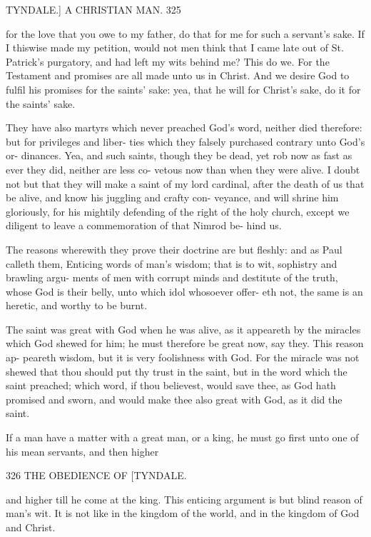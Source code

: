 \documentclass{custom}
\begin{document}
{TYNDALE.] A CHRISTIAN MAN. 325

for the love that you owe to my father, do that for me for
such a servant's sake. If I thiswise made my petition,
would not men think that I came late out of St. Patrick's
purgatory, and had left my wits behind me? This do we.
For the Testament and promises are all made unto us in
Christ. And we desire God to fulfil his promises for
the saints' sake: yea, that he will for Christ's sake, do it
for the saints' sake.

They have also martyrs which never preached God's
word, neither died therefore: but for privileges and liber-
ties which they falsely purchased contrary unto God's or-
dinances. Yea, and such saints, though they be dead,
yet rob now as fast as ever they did, neither are less co-
vetous now than when they were alive. I doubt not but that
they will make a saint of my lord cardinal, after the death
of us that be alive, and know his juggling and crafty con-
veyance, and will shrine him gloriously, for his mightily
defending of the right of the holy church, except we
diligent to leave a commemoration of that Nimrod be- 
hind us. 

The reasons wherewith they prove their doctrine are
but fleshly: and as Paul calleth them, Enticing words of
man's wisdom; that is to wit, sophistry and brawling argu-
ments of men with corrupt minds and destitute of the truth,
whose God is their belly, unto which idol whosoever offer-
eth not, the same is an heretic, and worthy to be burnt. 

The saint was great with God when he was alive, as it 
appeareth by the miracles which God shewed for him; he 
must therefore be great now, say they. This reason ap- 
peareth wisdom, but it is very foolishness with God. For 
the miracle was not shewed that thou should put thy trust
in the saint, but in the word which the saint preached; 
which word, if thou believest, would save thee, as God 
hath promised and sworn, and would make thee also great 
with God, as it did the saint. 

If a man have a matter with a great man, or a king, he 
must go first unto one of his mean servants, and then higher 


326
THE OBEDIENCE OF
[TYNDALE.

and higher till he come at the king. This enticing argument 
is but blind reason of man's wit. It is not like in the
kingdom of the world, and in the kingdom of God and 
Christ. 

}
\end{document}
